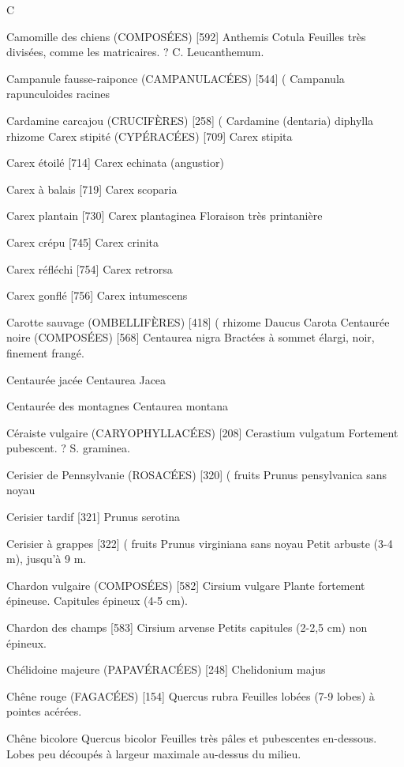 \documentclass[book,12pt,a4paper,onecolumn,openany]{memoir}
\begin{document}
C

Camomille des chiens (COMPOSÉES)  [592]
				Anthemis Cotula
Feuilles très divisées, comme les matricaires. ? C. Leucanthemum.

Campanule fausse-raiponce (CAMPANULACÉES)  [544]		(
				Campanula rapunculoides			racines

Cardamine carcajou (CRUCIFÈRES)  [258]				 (
				Cardamine (dentaria) diphylla	       rhizome
Carex stipité (CYPÉRACÉES)  [709]
				Carex stipita

Carex étoilé  [714]
				Carex echinata (angustior)

Carex à balais  [719]
				Carex scoparia

Carex plantain  [730]
				Carex plantaginea
Floraison très printanière

Carex crépu  [745]
				Carex crinita

Carex réfléchi  [754]
				Carex retrorsa

Carex gonflé  [756]
				Carex intumescens

Carotte sauvage (OMBELLIFÈRES)  [418]			( rhizome
				Daucus Carota
Centaurée noire (COMPOSÉES)  [568]
				Centaurea nigra
Bractées à sommet élargi, noir, finement frangé.

Centaurée jacée
				Centaurea Jacea

Centaurée des montagnes
				Centaurea montana

Céraiste vulgaire (CARYOPHYLLACÉES)  [208]
				Cerastium vulgatum
Fortement pubescent. ? S. graminea.

Cerisier de Pennsylvanie (ROSACÉES)  [320]		( fruits
				Prunus pensylvanica			sans noyau

Cerisier tardif  [321]
				Prunus serotina

Cerisier à grappes  [322]						( fruits
				Prunus virginiana			sans noyau
Petit arbuste (3-4 m), jusqu’à 9 m.

Chardon vulgaire (COMPOSÉES)  [582]
				Cirsium vulgare
Plante fortement épineuse. Capitules épineux (4-5 cm).

Chardon des champs  [583]
				Cirsium arvense
Petits capitules (2-2,5 cm) non épineux.

Chélidoine majeure (PAPAVÉRACÉES)  [248]
				Chelidonium majus

Chêne rouge (FAGACÉES)  [154]
				Quercus rubra
Feuilles lobées (7-9 lobes) à pointes acérées.

Chêne bicolore
				Quercus bicolor
Feuilles très pâles et pubescentes en-dessous. Lobes peu découpés à largeur maximale au-dessus du milieu.
\end{document}
